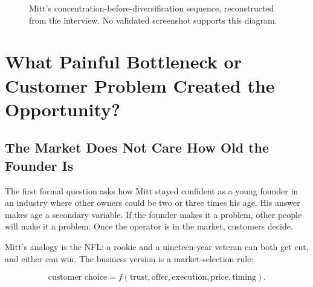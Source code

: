 \documentclass[11pt,oneside]{book}
\begin{document}
\begin{figure}
\centering
{}
\caption{Mitt's concentration-before-diversification sequence, reconstructed from the interview. No validated screenshot supports this diagram.}
\end{figure}

\chapter{What Painful Bottleneck or Customer Problem Created the Opportunity?}

\section{The Market Does Not Care How Old the Founder Is}

The first formal question asks how Mitt stayed confident as a young founder in an industry where other owners could be two or three times his age. His answer makes age a secondary variable. If the founder makes it a problem, other people will make it a problem. Once the operator is in the market, customers decide.

Mitt's analogy is the NFL: a rookie and a nineteen-year veteran can both get cut, and either can win. The business version is a market-selection rule:

\begin{equation}
\text{customer choice}
=
f(\text{trust},\text{offer},\text{execution},\text{price},\text{timing}).
\end{equation}
\end{document}
